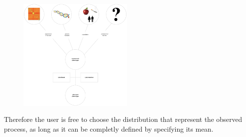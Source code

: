 \begin{figure}[ht]
  \centering
  \includegraphics[width=0.5\textwidth]{images/friendly-model.png}
\end{figure}

Therefore the user is free to choose the distribution that represent the
observed process, as long as it can be completly defined by specifying its mean.
